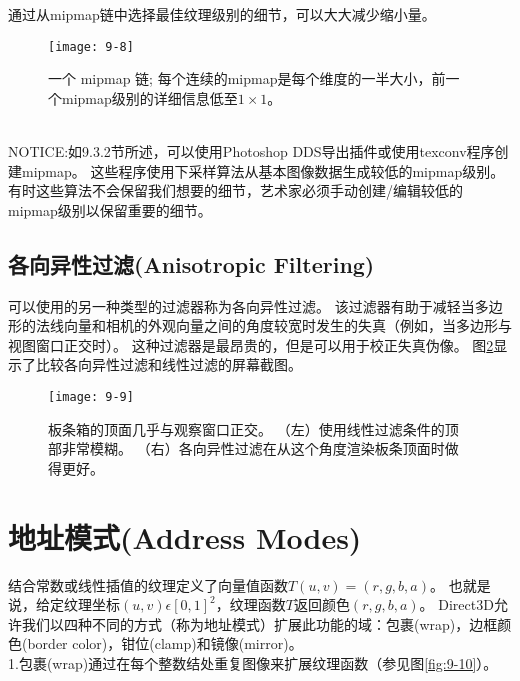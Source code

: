 \begin{flushleft}
通过从mipmap链中选择最佳纹理级别的细节，可以大大减少缩小量。
\end{flushleft}

\begin{figure}[h]
    \label{fig:9-8}
    \texttt{[image: 9-8]}
    \centering
    \caption{一个 mipmap 链; 每个连续的mipmap是每个维度的一半大小，前一个mipmap级别的详细信息低至$1\times 1$。}
\end{figure}

\begin{flushleft}
~\\
NOTICE:如9.3.2节所述，可以使用Photoshop DDS导出插件或使用texconv程序创建mipmap。 这些程序使用下采样算法从基本图像数据生成较低的mipmap级别。 有时这些算法不会保留我们想要的细节，艺术家必须手动创建/编辑较低的mipmap级别以保留重要的细节。
~\\
\end{flushleft}

\subsection{各向异性过滤(Anisotropic Filtering)}
\begin{flushleft}
可以使用的另一种类型的过滤器称为各向异性过滤。 该过滤器有助于减轻当多边形的法线向量和相机的外观向量之间的角度较宽时发生的失真（例如，当多边形与视图窗口正交时）。 这种过滤器是最昂贵的，但是可以用于校正失真伪像。 图\ref{fig:9-9}显示了比较各向异性过滤和线性过滤的屏幕截图。
\end{flushleft}

\begin{figure}[h]
    \label{fig:9-9}
    \texttt{[image: 9-9]}
    \centering
    \caption{板条箱的顶面几乎与观察窗口正交。 （左）使用线性过滤条件的顶部非常模糊。 （右）各向异性过滤在从这个角度渲染板条顶面时做得更好。}
\end{figure}

\section{地址模式(Address Modes)}
\begin{flushleft}
结合常数或线性插值的纹理定义了向量值函数$T(u,v)=(r,g,b,a)$。 也就是说，给定纹理坐标$(u,v)\epsilon [0,1]^{2}$，纹理函数$T$返回颜色$(r,g,b,a)$。 Direct3D允许我们以四种不同的方式（称为地址模式）扩展此功能的域：包裹(wrap)，边框颜色(border color)，钳位(clamp)和镜像(mirror)。\\
1.包裹(wrap)通过在每个整数结处重复图像来扩展纹理函数（参见图\ref{fig:9-10}）。
\end{flushleft}


